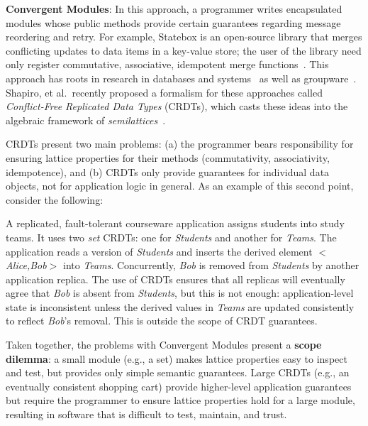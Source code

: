\vspace{0.5em}\noindent
\textbf{Convergent Modules}: In this approach, a programmer writes encapsulated
modules whose public methods provide certain guarantees regarding message
reordering and retry. For example, Statebox is an open-source library that
merges conflicting updates to data items in a key-value store; the user of the
library need only register commutative, associative, idempotent merge
functions~\cite{statebox}. This approach has roots in research in
databases and systems~\cite{Farrag1989,Garcia-Molina1983,O'Neil1986,Helland2009,Terry1995} as well as
groupware~\cite{Ellis1989,Sun1998}.  Shapiro, et al.\ recently proposed a formalism
for these approaches called \emph{Conflict-Free Replicated Data Types} (CRDTs),
which casts these ideas into the algebraic framework of {\em
  semilattices}~\cite{Shapiro2011a,Shapiro2011b}.

CRDTs present two main problems: (a) the programmer bears responsibility for ensuring lattice properties for their methods (commutativity, associativity, idempotence), and (b) CRDTs only provide guarantees for individual data objects, not for application logic in general. As an example of this second point, consider the following:

\vspace{-0.25em}
\begin{example}
A replicated, fault-tolerant courseware application assigns students into study teams.  It uses two \emph{set} CRDTs: one for \emph{Students} and another for \emph{Teams}.  The application reads a version of \emph{Students} and inserts the derived element $<$\emph{Alice,Bob}$>$ into \emph{Teams}. Concurrently, \emph{Bob} is removed from
\emph{Students} by another application replica. The use of CRDTs ensures that all replicas will
eventually agree that \emph{Bob} is absent from \emph{Students}, but this is not enough: application-level state
is inconsistent unless the derived values in \emph{Teams} are updated consistently to reflect \emph{Bob}'s
removal.  This is outside the scope of CRDT guarantees.
\end{example}

\vspace{-.25em}
Taken together, the problems with Convergent Modules present a {\bf scope
  dilemma}: a small module (e.g., a set) makes lattice properties easy to
inspect and test, but provides only simple semantic guarantees. Large CRDTs
(e.g., an eventually consistent shopping cart) provide higher-level application
guarantees but require the programmer to ensure lattice properties hold for a
large module, resulting in software that is difficult to test, maintain, and
trust.
% 

